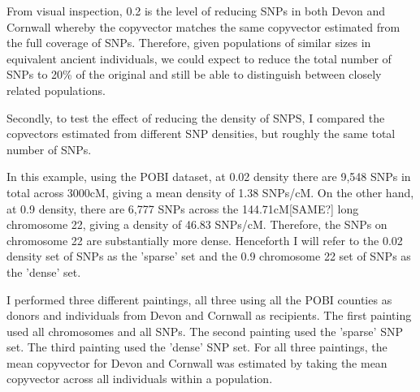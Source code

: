 From visual inspection, 0.2 is the level of reducing SNPs in both Devon and Cornwall whereby the copyvector matches the same copyvector estimated from the full coverage of SNPs. Therefore, given populations of similar sizes in equivalent ancient individuals, we could expect to reduce the total number of SNPs to 20\% of the original and still be able to distinguish between closely related populations.  

Secondly, to test the effect of reducing the density of SNPS, I compared the copvectors estimated from different SNP densities, but roughly the same total number of SNPs. 

In this example, using the POBI dataset, at 0.02 density there are 9,548 SNPs in total across 3000cM, giving a mean density of 1.38 SNPs/cM. On the other hand, at 0.9 density, there are 6,777 SNPs across the 144.71cM{\color{red}[SAME?]} long chromosome 22, giving a density of 46.83 SNPs/cM. Therefore, the SNPs on chromosome 22 are substantially more dense. Henceforth I will refer to the 0.02 density set of SNPs as the 'sparse' set and the 0.9 chromosome 22 set of SNPs as the 'dense' set. 

I performed three different paintings, all three using all the POBI counties as donors and individuals from Devon and Cornwall as recipients. The first painting used all chromosomes and all SNPs. The second painting used the 'sparse' SNP set. The third painting used the 'dense' SNP set. For all three paintings, the mean copyvector for Devon and Cornwall was estimated by taking the mean copyvector across all individuals within a population. 

